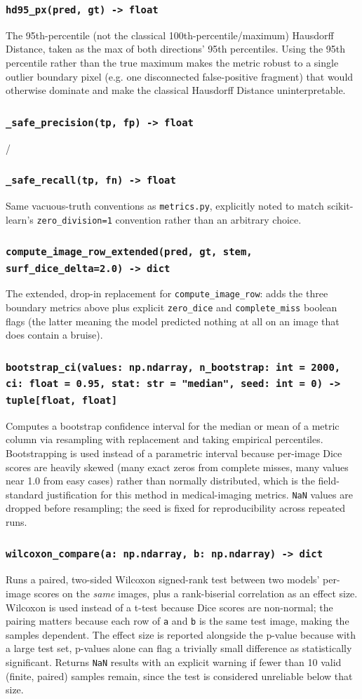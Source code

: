 \documentclass[11pt]{article}
\newcommand{\func}[1]{\subsubsection*{\texttt{#1}}}
\begin{document}
\func{hd95\_px(pred, gt) -> float}
The 95th-percentile (not the classical 100th-percentile/maximum) Hausdorff
Distance, taken as the max of both directions' 95th percentiles. Using the 95th
percentile rather than the true maximum makes the metric robust to a single
outlier boundary pixel (e.g. one disconnected false-positive fragment) that
would otherwise dominate and make the classical Hausdorff Distance
uninterpretable.

\func{\_safe\_precision(tp, fp) -> float} / \func{\_safe\_recall(tp, fn) -> float}
Same vacuous-truth conventions as \texttt{metrics.py}, explicitly noted to match
scikit-learn's \texttt{zero\_division=1} convention rather than an arbitrary
choice.

\func{compute\_image\_row\_extended(pred, gt, stem, surf\_dice\_delta=2.0) -> dict}
The extended, drop-in replacement for \texttt{compute\_image\_row}: adds the
three boundary metrics above plus explicit \texttt{zero\_dice} and
\texttt{complete\_miss} boolean flags (the latter meaning the model predicted
nothing at all on an image that does contain a bruise).

\func{bootstrap\_ci(values: np.ndarray, n\_bootstrap: int = 2000, ci: float = 0.95, stat: str = "median", seed: int = 0) -> tuple[float, float]}
Computes a bootstrap confidence interval for the median or mean of a metric
column via resampling with replacement and taking empirical percentiles.
Bootstrapping is used instead of a parametric interval because per-image Dice
scores are heavily skewed (many exact zeros from complete misses, many values
near 1.0 from easy cases) rather than normally distributed, which is the
field-standard justification for this method in medical-imaging metrics.
\texttt{NaN} values are dropped before resampling; the seed is fixed for
reproducibility across repeated runs.

\func{wilcoxon\_compare(a: np.ndarray, b: np.ndarray) -> dict}
Runs a paired, two-sided Wilcoxon signed-rank test between two models' per-image
scores on the \emph{same} images, plus a rank-biserial correlation as an effect
size. Wilcoxon is used instead of a t-test because Dice scores are non-normal;
the pairing matters because each row of \texttt{a} and \texttt{b} is the same
test image, making the samples dependent. The effect size is reported alongside
the p-value because with a large test set, p-values alone can flag a trivially
small difference as statistically significant. Returns \texttt{NaN} results
with an explicit warning if fewer than 10 valid (finite, paired) samples remain,
since the test is considered unreliable below that size.
\end{document}

